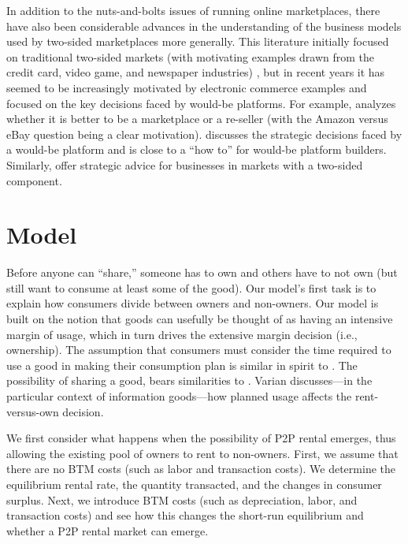 \documentclass[11pt]{article}
\begin{document}
In addition to the nuts-and-bolts issues of running online marketplaces, there have also been considerable advances in the understanding of the business models used by two-sided marketplaces more generally. 
This literature initially focused on traditional two-sided markets (with motivating examples drawn from the credit card, video game, and  newspaper industries) \citep{rochet2003platform, rochet2006two}, 
but in recent years it has seemed to be increasingly motivated by electronic commerce examples and focused on the key decisions faced by would-be platforms.
For example, \cite{hagiu2014marketplace} analyzes whether it is better to be a marketplace or a re-seller (with the Amazon versus eBay question being a clear motivation).
\cite{hagiu2014strategic} discusses the strategic decisions faced by a would-be platform and is close to a ``how to'' for would-be platform builders.
Similarly, \cite{eisenmann2006strategies} offer strategic advice for businesses in markets with a two-sided component.  

\section{Model} \label{sec:model}

Before anyone can ``share,'' someone has to own and others have to not own (but still want to consume at least some of the good).
Our model's first task is to explain how consumers divide between owners and non-owners. 
Our model is built on the notion that goods can usefully be thought of as having an intensive margin of usage, which in turn drives the extensive margin decision (i.e., ownership). 
The assumption that consumers must consider the time required to use a good in making their consumption plan is similar in spirit to \cite{becker1965theory}.
The possibility of sharing a good, bears similarities to \cite{varian2000}.
Varian discusses---in the particular context of information goods---how planned usage affects the rent-versus-own decision. 

We first consider what happens when the possibility of P2P rental emerges, thus allowing the existing pool of owners to rent to non-owners. 
First, we assume that there are no BTM costs (such as labor and transaction costs).
We determine the equilibrium rental rate, the quantity transacted, and the changes in consumer surplus. 
Next, we introduce BTM costs (such as depreciation, labor, and transaction costs) and see how this changes the short-run equilibrium and whether a P2P rental market can emerge. 
\end{document}
